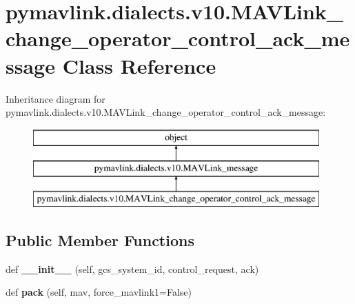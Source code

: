 \hypertarget{classpymavlink_1_1dialects_1_1v10_1_1MAVLink__change__operator__control__ack__message}{}\section{pymavlink.\+dialects.\+v10.\+M\+A\+V\+Link\+\_\+change\+\_\+operator\+\_\+control\+\_\+ack\+\_\+message Class Reference}
\label{classpymavlink_1_1dialects_1_1v10_1_1MAVLink__change__operator__control__ack__message}
Inheritance diagram for pymavlink.\+dialects.\+v10.\+M\+A\+V\+Link\+\_\+change\+\_\+operator\+\_\+control\+\_\+ack\+\_\+message\+:\begin{figure}[H]
\begin{center}
\leavevmode
\includegraphics[height=3.000000cm]{classpymavlink_1_1dialects_1_1v10_1_1MAVLink__change__operator__control__ack__message}
\end{center}
\end{figure}
\subsection*{Public Member Functions}
\begin{DoxyCompactItemize}
\item 
\mbox{\label{classpymavlink_1_1dialects_1_1v10_1_1MAVLink__change__operator__control__ack__message_a09864a94de0ab23837a203a488a1c81c}} 
def {\bfseries \+\_\+\+\_\+init\+\_\+\+\_\+} (self, gcs\+\_\+system\+\_\+id, control\+\_\+request, ack)
\item 
\mbox{\label{classpymavlink_1_1dialects_1_1v10_1_1MAVLink__change__operator__control__ack__message_a92b2c570d9a5eadedcb7ce79f965a068}} 
def {\bfseries pack} (self, mav, force\+\_\+mavlink1=False)
\end{DoxyCompactItemize}
